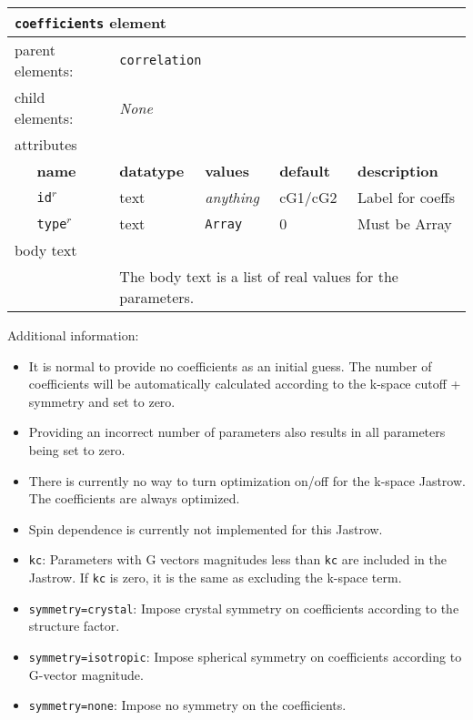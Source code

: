 \FloatBarrier
\begin{table}[h]
\begin{center}
\begin{tabularx}{\textwidth}{l l l l l X }
\hline
\multicolumn{6}{l}{\texttt{coefficients} element} \\
\hline
\multicolumn{2}{l}{parent elements:} & \multicolumn{4}{l}{\texttt{correlation}}\\
\multicolumn{2}{l}{child  elements:} & \multicolumn{4}{l}{\textit{None}}\\
\multicolumn{2}{l}{attributes}  & \multicolumn{4}{l}{}\\
   &   \bfseries name     & \bfseries datatype & \bfseries values  & \bfseries default   & \bfseries description \\
   & \texttt{id}$^r$      &  text              & \textit{anything} &     cG1/cG2         & Label for coeffs     \\
   & \texttt{type}$^r$    &  text              & \texttt{Array}    &   0                 & Must be Array \\
\multicolumn{2}{l}{body text}  & \multicolumn{4}{l}{}\\
   &                           & \multicolumn{4}{l}{The body text is a list of real values for the parameters.}     \\
  \hline
\end{tabularx}
\end{center}
\end{table}
\FloatBarrier


Additional information:
\begin{itemize}
  \item{It is normal to provide no coefficients as an initial guess.  The number of coefficients will be automatically calculated according to the k-space cutoff + symmetry and set to zero. }
  \item{Providing an incorrect number of parameters also results in all parameters being set to zero.}
  \item{There is currently no way to turn optimization on/off for the k-space Jastrow.  The coefficients are always optimized.}
  \item{Spin dependence is currently not implemented for this Jastrow.}
  \item{\texttt{kc}: Parameters with G vectors magnitudes less than \texttt{kc} are included in the Jastrow.  If \texttt{kc} is zero, it is the same as excluding the k-space term.}
  \item{\texttt{symmetry=crystal}: Impose crystal symmetry on coefficients according to the structure factor.}
  \item{\texttt{symmetry=isotropic}: Impose spherical symmetry on coefficients according to G-vector magnitude.}
  \item{\texttt{symmetry=none}: Impose no symmetry on the coefficients.}
\end{itemize}


